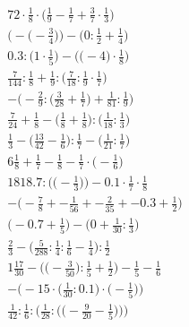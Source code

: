 \documentclass[8pt]{article}
\begin{document}
\begin{align}
72 \cdot \frac{1}{8} \cdot \big(\frac{1}{9} - \frac{1}{7} + \frac{3}{7} \cdot \frac{1}{3}\big) \\
\Big(-\big(-\frac{3}{4}\big)\Big) - \Big(0 : \frac{1}{2} + \frac{1}{4}\Big) \\
0.3 : \Big(1 \cdot \frac{1}{5}\Big) - \Big(\big(-4\big) \cdot \frac{1}{8}\Big) \\
\frac{7}{144} : \frac{1}{8} + \frac{1}{9} : \big(\frac{7}{18} : \frac{1}{9} \cdot \frac{1}{7}\big) \\
-\Big(-\frac{2}{9} : \big(\frac{3}{28} + \frac{1}{7}\big) + \frac{1}{81} : \frac{1}{9}\Big) \\
\frac{7}{24} + \frac{1}{8} - \big(\frac{1}{8} + \frac{1}{8}\big) : \big(\frac{1}{18} : \frac{1}{3}\big) \\
\frac{1}{3} - \big(\frac{13}{42} - \frac{1}{6}\big) : \frac{1}{7} - \big(\frac{1}{21} : \frac{1}{7}\big) \\
6\frac{1}{8} + \frac{1}{7} - \frac{1}{8} - \frac{1}{7} \cdot \big(-\frac{1}{6}\big) \\
1818.7 : \Big(\big(-\frac{1}{3}\big)\Big) - 0.1 \cdot \frac{1}{7} \cdot \frac{1}{8} \\
-\big(-\frac{7}{8} + -\frac{1}{56} + -\frac{2}{35} + -0.3 + \frac{1}{2}\big) \\
\big(-0.7 + \frac{1}{5}\big) - \big(0 + \frac{1}{30} : \frac{1}{3}\big) \\
\frac{2}{3} - \big(\frac{5}{288} : \frac{1}{4} : \frac{1}{6} - \frac{1}{4}\big) : \frac{1}{2} \\
1\frac{17}{30} - \Big(\big(-\frac{3}{50}\big) : \frac{1}{5} + \frac{1}{2}\Big) - \frac{1}{5} - \frac{1}{6} \\
-\Big(-15 \cdot \big(\frac{1}{30} : 0.1\big) \cdot \big(-\frac{1}{5}\big)\Big) \\
\frac{1}{42} : \frac{1}{6} : \bigg(\frac{1}{28} : \Big(\big(-\frac{9}{20} - \frac{1}{5}\big)\Big)\bigg)
\end{align}
\end{document}
